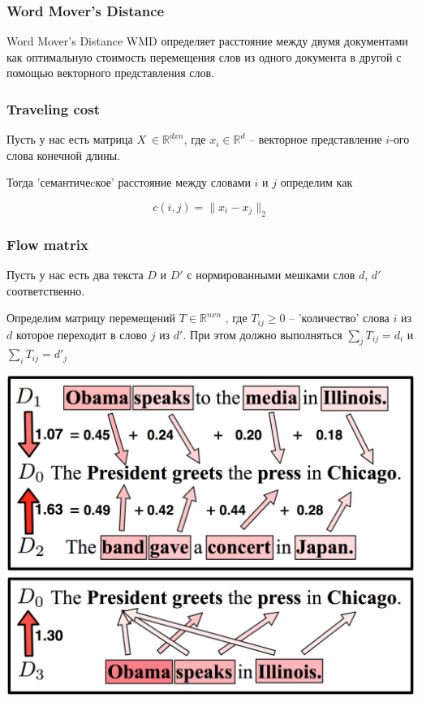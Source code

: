 \documentclass{beamer}
\begin{document}
\begin{frame}
\frametitle{Word Mover's Distance}
\begin{block}{Word Mover's Distance}
WMD определяет расстояние между двумя документами как оптимальную стоимость перемещения слов из одного документа в другой с помощью векторного представления слов.
\end{block}
\end{frame}


\begin{frame}
\frametitle{Traveling cost}

Пусть у нас есть матрица $X \ \in \mathbb{R}^{dxn}$, где $x_i \in \mathbb{R}^{d}$ --  векторное представление $i$-ого слова конечной длины.

Тогда 'семантичеcкое' расстояние между словами $i$ и $j$ определим как

$$
c(i, j) = \|x_i - x_j \|_2
$$

\end{frame}

\begin{frame}
\frametitle{Flow matrix}

Пусть у нас есть два текста $D$ и $D'$ с нормированными мешками слов $d$, $d'$ соответственно.

Определим матрицу перемещений $T \in \mathbb{R}^{nxn}$ , где $T_{ij} \geq 0$ -- 'количество' слова $i$ из $d$ которое переходит в слово $j$ из $d'$. При этом должно выполняться $\sum_{j} T_{ij} = d_i$ и $\sum_{i} T_{ij} = d'_j$


\begin{center}
\includegraphics[width=0.4 \textwidth]{1.png}
\end{center}
\end{frame}
\end{document}

